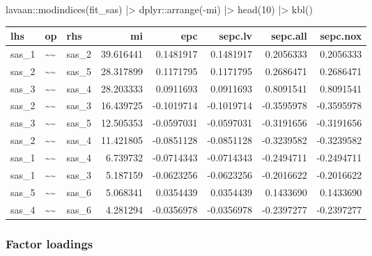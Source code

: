 \documentclass[
  letterpaper,
  DIV=11,
  numbers=noendperiod]{scrreprt}
\newenvironment{Shaded}{\begin{snugshade}}{\end{snugshade}}
\newcommand{\DecValTok}[1]{\textcolor[rgb]{0.68,0.00,0.00}{#1}}
\newcommand{\FunctionTok}[1]{\textcolor[rgb]{0.28,0.35,0.67}{#1}}
\newcommand{\NormalTok}[1]{\textcolor[rgb]{0.00,0.23,0.31}{#1}}
\newcommand{\SpecialCharTok}[1]{\textcolor[rgb]{0.37,0.37,0.37}{#1}}
\begin{document}
\begin{Shaded}
\begin{Highlighting}[]
\NormalTok{lavaan}\SpecialCharTok{::}\FunctionTok{modindices}\NormalTok{(fit\_sas) }\SpecialCharTok{|\textgreater{}} 
\NormalTok{  dplyr}\SpecialCharTok{::}\FunctionTok{arrange}\NormalTok{(}\SpecialCharTok{{-}}\NormalTok{mi) }\SpecialCharTok{|\textgreater{}} 
  \FunctionTok{head}\NormalTok{(}\DecValTok{10}\NormalTok{) }\SpecialCharTok{|\textgreater{}} 
  \FunctionTok{kbl}\NormalTok{()}
\end{Highlighting}
\end{Shaded}

\begin{tabular}[t]{l|l|l|r|r|r|r|r}
\hline
lhs & op & rhs & mi & epc & sepc.lv & sepc.all & sepc.nox\\
\hline
sas\_1 & \textasciitilde{}\textasciitilde{} & sas\_2 & 39.616441 & 0.1481917 & 0.1481917 & 0.2056333 & 0.2056333\\
\hline
sas\_2 & \textasciitilde{}\textasciitilde{} & sas\_5 & 28.317899 & 0.1171795 & 0.1171795 & 0.2686471 & 0.2686471\\
\hline
sas\_3 & \textasciitilde{}\textasciitilde{} & sas\_4 & 28.203333 & 0.0911693 & 0.0911693 & 0.8091541 & 0.8091541\\
\hline
sas\_2 & \textasciitilde{}\textasciitilde{} & sas\_3 & 16.439725 & -0.1019714 & -0.1019714 & -0.3595978 & -0.3595978\\
\hline
sas\_3 & \textasciitilde{}\textasciitilde{} & sas\_5 & 12.505353 & -0.0597031 & -0.0597031 & -0.3191656 & -0.3191656\\
\hline
sas\_2 & \textasciitilde{}\textasciitilde{} & sas\_4 & 11.421805 & -0.0851128 & -0.0851128 & -0.3239582 & -0.3239582\\
\hline
sas\_1 & \textasciitilde{}\textasciitilde{} & sas\_4 & 6.739732 & -0.0714343 & -0.0714343 & -0.2494711 & -0.2494711\\
\hline
sas\_1 & \textasciitilde{}\textasciitilde{} & sas\_3 & 5.187159 & -0.0623256 & -0.0623256 & -0.2016622 & -0.2016622\\
\hline
sas\_5 & \textasciitilde{}\textasciitilde{} & sas\_6 & 5.068341 & 0.0354439 & 0.0354439 & 0.1433690 & 0.1433690\\
\hline
sas\_4 & \textasciitilde{}\textasciitilde{} & sas\_6 & 4.281294 & -0.0356978 & -0.0356978 & -0.2397277 & -0.2397277\\
\hline
\end{tabular}

\hypertarget{factor-loadings}{%
\subsubsection{Factor loadings}\label{factor-loadings}}
\end{document}
